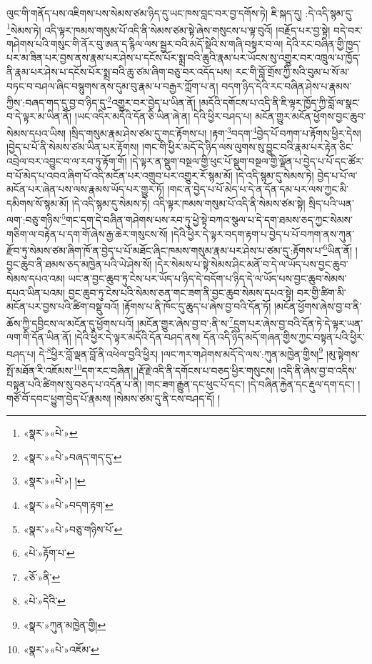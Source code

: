 ལུང་གི་གནོད་པས་འཇིགས་པས་སེམས་ཙམ་ཉིད་དུ་ཡང་ཁས་བླང་བར་བྱ་དགོས་ཏེ། ཇི་སྐད་དུ། :དེ་འདི་སྙམ་དུ་\footnote{«སྣར་»«པེ་»}སེམས་ཏེ། འདི་ལྟར་ཁམས་གསུམ་པོ་འདི་ནི་སེམས་ཙམ་སྟེ་ཞེས་གསུངས་པ་ལྟ་བུའོ། །བརྗོད་པར་བྱ་སྟེ། བདེ་བར་གཤེགས་པའི་གསུང་གི་ནོར་བུ་ཨན་ད་རྙིལ་ལས་སྦྱར་བའི་མདོ་སྡེའི་ས་གཞི་བསྟར་བ་ལ། དེའི་རང་བཞིན་གྱི་ཁྱད་པར་མ་ཟིན་པར་བྱས་ནས་རྣམ་པར་ཤེས་པ་དངོས་པོར་སྨྲ་བའི་ཆུའི་རྣམ་པར་ཡོངས་སུ་འགྱུར་བར་འཁྲུལ་པ་ཁྱོད་ནི་རྣམ་པར་ཤེས་པ་དངོས་པོར་སྨྲ་བའི་ཆུ་ཙམ་ཞིག་བཅུ་བར་འདོད་པས། རང་གི་བློ་གྲོས་ཀྱི་སའི་བུམ་པ་སོ་མ་བཏང་བ་བཤལ་ཞིང་བསྙུགས་ནས་དུམ་བུ་རྣམ་པ་བརྒྱར་ཀློག་པ་ན། བདག་ཉིད་དེའི་རང་བཞིན་ཤེས་པ་རྣམས་ཀྱིས་:བཞད་གད་དུ་བྱ་བ་ཉིད་དུ་\footnote{«སྣར་»«པེ་»བཞད་གད་དུ་}འགྱུར་བར་བྱེད་པ་ཡིན་ནོ། །མདོའི་དགོངས་པ་འདི་ནི་ཇི་ལྟར་ཁྱོད་ཀྱི་བློ་ལ་སྣང་བ་དེ་ལྟར་མ་ཡིན་ནོ། །ཡང་འདིར་མདོའི་དོན་ཅི་ཡིན་ཞེ་ན། དེའི་ཕྱིར་བཤད་པ། མངོན་གྱུར་མངོན་ཕྱོགས་བྱང་ཆུབ་སེམས་དཔའ་ཡིས། །སྲིད་གསུམ་རྣམ་ཤེས་ཙམ་དུ་གང་རྟོགས་པ། །རྟག་\footnote{«སྣར་»«པེ་»། །}བདག་\footnote{«སྣར་»«པེ་»བདག་རྟག་}བྱེད་པོ་བཀག་པ་རྟོགས་ཕྱིར་དེས། །བྱེད་པ་པོ་ནི་སེམས་ཙམ་ཡིན་པར་རྟོགས། །གང་གི་ཕྱིར་མདོ་དེ་ཉིད་ལས་ལུགས་སུ་བྱུང་བའི་རྣམ་པར་རྟེན་ཅིང་འབྲེལ་བར་འབྱུང་བ་ལ་རབ་ཏུ་རྟོག་གོ། །དེ་ལྟར་ན་སྡུག་བསྔལ་གྱི་ཕུང་པོ་སྡུག་བསྔལ་གྱི་ལྗོན་པ་བྱེད་པ་པོ་དང་ཚོར་བ་པོ་མེད་པ་འབའ་ཞིག་པོ་འདི་མངོན་པར་འགྲུབ་པར་འགྱུར་རོ་སྙམ་མོ། །དེ་འདི་སྙམ་དུ་སེམས་ཏེ། བྱེད་པ་པོ་ལ་མངོན་པར་ཞེན་པས་ལས་རྣམས་ཡོད་པར་གྱུར་ཏོ། །གང་ན་བྱེད་པ་པོ་མེད་པ་དེ་ན་དོན་དམ་པར་ལས་ཀྱང་མི་དམིགས་སོ་སྙམ་མོ། །དེ་འདི་སྙམ་དུ་སེམས་ཏེ། འདི་ལྟར་ཁམས་གསུམ་པོ་འདི་ནི་སེམས་ཙམ་སྟེ། སྲིད་པའི་ཡན་ལག་:བཅུ་གཉིས་\footnote{«སྣར་»«པེ་»བཅུ་གཉིས་པོ་}གང་དག་དེ་བཞིན་གཤེགས་པས་རབ་ཏུ་ཕྱེ་སྟེ་བཀའ་སྩལ་པ་དེ་དག་ཐམས་ཅད་ཀྱང་སེམས་གཅིག་ལ་བརྟེན་པ་དག་གོ་ཞེས་རྒྱ་ཆེར་གསུངས་སོ། །དེའི་ཕྱིར་དེ་ལྟར་བདག་རྟག་པ་བྱེད་པ་པོ་བཀག་ནས་ཀུན་རྫོབ་ཏུ་སེམས་ཙམ་ཞིག་ཁོ་ན་བྱེད་པ་པོ་མཐོང་ཞིང་ཁམས་གསུམ་རྣམ་པར་ཤེས་པ་ཙམ་དུ་:རྟོགས་པ་\footnote{«པེ་»རྟོག་པ་}ཡིན་ནོ། །བྱང་ཆུབ་ནི་ཐམས་ཅད་མཁྱེན་པའི་ཡེ་ཤེས་སོ། །དེར་སེམས་པ་སྟེ་སེམས་ཤིང་མནོ་བ་དེ་ལ་ཡོད་པས་བྱང་ཆུབ་སེམས་དཔའ་འམ། ཡང་ན་བྱང་ཆུབ་ཏུ་ངེས་པར་ཡོད་པ་ཉིད་དེ་བདོག་པ་ཉིད་དེ་ལ་ཡོད་པས་བྱང་ཆུབ་སེམས་དཔའ་ཡིན་པའམ། བྱང་ཆུབ་ཏུ་ངེས་པའི་སེམས་ཅན་གང་ཟག་ནི་བྱང་ཆུབ་སེམས་དཔའ་སྟེ། བར་གྱི་ཚིག་མི་མངོན་པར་བྱས་པའི་ཚིག་བསྡུ་བའོ། །རྟོགས་པ་ནི་ཁོང་དུ་ཆུད་པ་ཞེས་བྱ་བའི་དོན་ཏོ། །མངོན་ཕྱོགས་ཞེས་བྱ་བ་ནི་ཆོས་ཀྱི་དབྱིངས་ལ་མངོན་དུ་ཕྱོགས་པའོ། །མངོན་གྱུར་ཞེས་བྱ་བ་:ནི་ས་\footnote{«ཅོ་»ནི་}དྲུག་པར་ཞེས་བྱ་བའི་དོན་ཏེ་དེ་ལྟར་ཡན་ལག་གི་དོན་ཡིན་ནོ། །དེའི་ཕྱིར་དེ་ལྟར་མདོའི་དོན་བཤད་ནས། དོན་འདི་ཉིད་མདོ་གཞན་གྱིས་ཀྱང་བསྟན་པའི་ཕྱིར་བཤད་པ། དེ་\footnote{«པེ་»དེའི་}ཕྱིར་བློ་ལྡན་བློ་ནི་འཕེལ་བྱའི་ཕྱིར། །ལང་ཀར་གཤེགས་མདོ་དེ་ལས་:ཀུན་མཁྱེན་གྱིས།\footnote{«སྣར་»ཀུན་མཁྱེན་གྱི།} །མུ་སྟེགས་སྤོ་མཐོན་རི་འཇོམས་\footnote{«སྣར་»«པེ་»འཇོམ་}དག་རང་བཞིན། །རྡོ་རྗེ་འདི་ནི་དགོངས་པ་བཅད་ཕྱིར་གསུངས། །འདི་ནི་ཞེས་བྱ་བ་འདིས་བསྟན་པའི་ཚིགས་སུ་བཅད་པ་འདོན་པ་ནི། །གང་ཟག་རྒྱུན་དང་ཕུང་པོ་དང་། །དེ་བཞིན་རྐྱེན་དང་རྡུལ་དག་དང་། །གཙོ་བོ་དབང་ཕྱུག་བྱེད་པོ་རྣམས། །སེམས་ཙམ་དུ་ནི་ངས་བཤད་དོ། །
